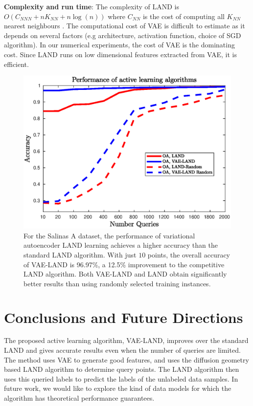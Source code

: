 \documentclass{article}
\begin{document}
\noindent \textbf{Complexity and run time}: The complexity of LAND is $O(C_{NNN}+nK_{NN}+n\log(n))$ where $C_{NN}$ is the cost of computing all $K_{NN}$ nearest neighbours \cite{Maggioni2019_LAND}. 
The computational cost of VAE is difficult to estimate as it depends on several factors (e.g architecture, activation function, choice of SGD algorithm). In our numerical experiments, the cost of VAE is the dominating cost. Since LAND runs on low dimensional features extracted from VAE, it is efficient. 

\begin{figure}
    \includegraphics[width=.45\textwidth]{Images/salinasa_results_improved.eps}
    \caption{For the Salinas A dataset, the performance of variational autoencoder LAND learning achieves a higher accuracy than the standard LAND algorithm. With just $10$ points, the overall accuracy of VAE-LAND is 96.97\%, a 12.5\% improvement to the competitive LAND algorithm. Both VAE-LAND and LAND obtain significantly better results than using randomly selected training instances. }
    \label{fig:my_label}
\end{figure}


\section{Conclusions and Future Directions}
\label{sec:Conclusions}
The proposed active learning algorithm, VAE-LAND, improves over the standard LAND and gives accurate results even when the number of queries are limited. The method uses VAE to generate good features, and uses the diffusion geometry based LAND algorithm to determine query points. The LAND algorithm then uses this queried labels to predict the labels of the unlabeled data samples. In future work, we would like to explore the kind of data models for which the algorithm has theoretical performance guarantees.   




\end{document}
